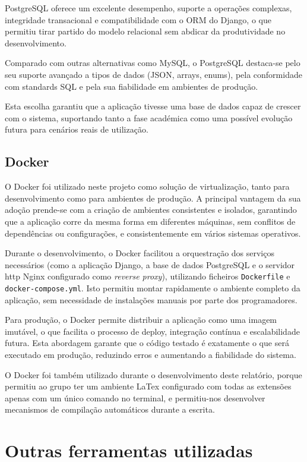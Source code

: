 PostgreSQL oferece um excelente desempenho, suporte a operações complexas, integridade transacional e compatibilidade com o ORM do Django, o que permitiu tirar partido do modelo relacional sem abdicar da produtividade no desenvolvimento.

Comparado com outras alternativas como MySQL, o PostgreSQL destaca-se pelo seu suporte avançado a tipos de dados (\gls{JSON}, arrays, enums), pela conformidade com standards SQL e pela sua fiabilidade em ambientes de produção.

Esta escolha garantiu que a aplicação tivesse uma base de dados capaz de crescer com o sistema, suportando tanto a fase académica como uma possível evolução futura para cenários reais de utilização.

\subsection{Docker}

O Docker foi utilizado neste projeto como solução de virtualização, tanto para desenvolvimento como para ambientes de produção. A principal vantagem da sua adoção prende-se com a criação de ambientes consistentes e isolados, garantindo que a aplicação corre da mesma forma em diferentes máquinas, sem conflitos de dependências ou configurações, e consistentemente em vários sistemas operativos.

Durante o desenvolvimento, o Docker facilitou a orquestração dos serviços necessários (como a aplicação Django, a base de dados PostgreSQL e o servidor \gls{http} Nginx configurado como \textit{reverse proxy}), utilizando ficheiros \texttt{Dockerfile} e \texttt{docker-compose.yml}. Isto permitiu montar rapidamente o ambiente completo da aplicação, sem necessidade de instalações manuais por parte dos programadores.

Para produção, o Docker permite distribuir a aplicação como uma imagem imutável, o que facilita o processo de deploy, integração contínua e escalabilidade futura. Esta abordagem garante que o código testado é exatamente o que será executado em produção, reduzindo erros e aumentando a fiabilidade do sistema.

O Docker foi também utilizado durante o desenvolvimento deste relatório, porque permitiu ao grupo ter um ambiente LaTex configurado com todas as extensões apenas com um único comando no terminal, e permitiu-nos desenvolver mecanismos de compilação automáticos durante a escrita. 


\section{Outras ferramentas utilizadas}
\label{sec:tools}

